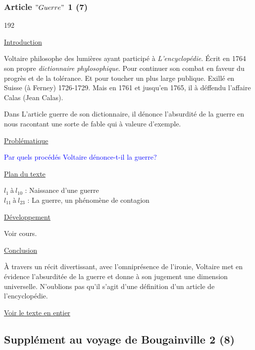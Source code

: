 \documentclass[12pt,a4paper]{article}
\begin{document}
				\subsubsection{Article $"Guerre"$ 1 (7)}

\begin{dingautolist}{192}

\item \underline{Introduction} \par
	Voltaire philosophe des lumi\`eres ayant particip\'e \`a \textit{L'encyclop\'edie}. \'Ecrit en 1764 son propre \textit{dictionnaire phylosophique}. 
	Pour continuer son combat en faveur du progr\`es et de la tol\'erance. Et pour toucher un plus large publique. Exill\'e en Suisse (\`a Ferney) 1726-1729. Mais en 1761 et jusqu'en 1765, il \`a d\'effendu l'affaire Calas (Jean Calas).\par
	Dans L'article guerre de son dictionnaire, il d\'enonce l'absurdit\'e de la guerre en nous racontant une sorte de fable qui \`a valeure d'exemple.
	
\item \underline{Probl\'ematique }\par
	\textcolor{blue}{Par quels proc\'ed\'es Voltaire d\'enonce-t-il la guerre?}

\item \underline{Plan du texte} \par
	$l_{1}~$\`a$~l_{10}$ : Naissance d'une guerre \\
	$l_{11}~$\`a$~l_{23}$ : La guerre, un ph\'enom\`ene de contagion

\item \underline{D\'eveloppement} \par
        Voir cours.

\item \underline{Conclusion} \par
	\`A travers un r\'ecit divertissant, avec l'omnipr\'esence de l'ironie, Voltaire met en \'evidence l'absurdit\'ee de la guerre et donne \`a son jugement une dimension universelle. N'oublions pas qu'il s'agit d'une d\'efinition d'un article de l'encyclop\'edie. 

\end{dingautolist}
\href{.extra/Textes/Article_Guerre.pdf}{Voir le texte en entier}
 \newpage

				\subsection{Suppl\'ement au voyage de Bougainville 2 (8)}
\end{document}
